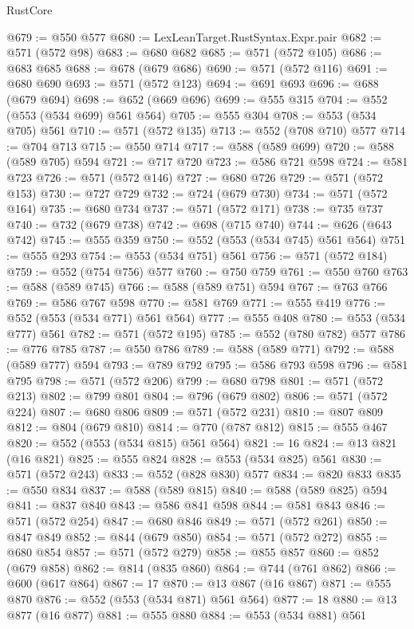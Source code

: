 \begin{lexlean}{RustCore}
\begin{coremodule}
@679 := @550 @577
@680 := LexLeanTarget.RustSyntax.Expr.pair
@682 := @571 (@572 @98)
@683 := @680 @682
@685 := @571 (@572 @105)
@686 := @683 @685
@688 := @678 (@679 @686)
@690 := @571 (@572 @116)
@691 := @680 @690
@693 := @571 (@572 @123)
@694 := @691 @693
@696 := @688 (@679 @694)
@698 := @652 (@669 @696)
@699 := @555 @315
@704 := @552 (@553 (@534 @699) @561 @564)
@705 := @555 @304
@708 := @553 (@534 @705) @561
@710 := @571 (@572 @135)
@713 := @552 (@708 @710) @577
@714 := @704 @713
@715 := @550 @714
@717 := @588 (@589 @699)
@720 := @588 (@589 @705) @594
@721 := @717 @720
@723 := @586 @721 @598
@724 := @581 @723
@726 := @571 (@572 @146)
@727 := @680 @726
@729 := @571 (@572 @153)
@730 := @727 @729
@732 := @724 (@679 @730)
@734 := @571 (@572 @164)
@735 := @680 @734
@737 := @571 (@572 @171)
@738 := @735 @737
@740 := @732 (@679 @738)
@742 := @698 (@715 @740)
@744 := @626 (@643 @742)
@745 := @555 @359
@750 := @552 (@553 (@534 @745) @561 @564)
@751 := @555 @293
@754 := @553 (@534 @751) @561
@756 := @571 (@572 @184)
@759 := @552 (@754 @756) @577
@760 := @750 @759
@761 := @550 @760
@763 := @588 (@589 @745)
@766 := @588 (@589 @751) @594
@767 := @763 @766
@769 := @586 @767 @598
@770 := @581 @769
@771 := @555 @419
@776 := @552 (@553 (@534 @771) @561 @564)
@777 := @555 @408
@780 := @553 (@534 @777) @561
@782 := @571 (@572 @195)
@785 := @552 (@780 @782) @577
@786 := @776 @785
@787 := @550 @786
@789 := @588 (@589 @771)
@792 := @588 (@589 @777) @594
@793 := @789 @792
@795 := @586 @793 @598
@796 := @581 @795
@798 := @571 (@572 @206)
@799 := @680 @798
@801 := @571 (@572 @213)
@802 := @799 @801
@804 := @796 (@679 @802)
@806 := @571 (@572 @224)
@807 := @680 @806
@809 := @571 (@572 @231)
@810 := @807 @809
@812 := @804 (@679 @810)
@814 := @770 (@787 @812)
@815 := @555 @467
@820 := @552 (@553 (@534 @815) @561 @564)
@821 := 16
@824 := @13 @821 (@16 @821)
@825 := @555 @824
@828 := @553 (@534 @825) @561
@830 := @571 (@572 @243)
@833 := @552 (@828 @830) @577
@834 := @820 @833
@835 := @550 @834
@837 := @588 (@589 @815)
@840 := @588 (@589 @825) @594
@841 := @837 @840
@843 := @586 @841 @598
@844 := @581 @843
@846 := @571 (@572 @254)
@847 := @680 @846
@849 := @571 (@572 @261)
@850 := @847 @849
@852 := @844 (@679 @850)
@854 := @571 (@572 @272)
@855 := @680 @854
@857 := @571 (@572 @279)
@858 := @855 @857
@860 := @852 (@679 @858)
@862 := @814 (@835 @860)
@864 := @744 (@761 @862)
@866 := @600 (@617 @864)
@867 := 17
@870 := @13 @867 (@16 @867)
@871 := @555 @870
@876 := @552 (@553 (@534 @871) @561 @564)
@877 := 18
@880 := @13 @877 (@16 @877)
@881 := @555 @880
@884 := @553 (@534 @881) @561

\end{coremodule}
\end{lexlean}
